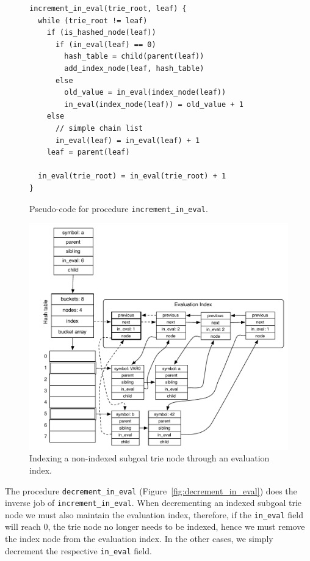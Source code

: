 \begin{figure}[ht]
\begin{Verbatim}
increment_in_eval(trie_root, leaf) {
  while (trie_root != leaf)
    if (is_hashed_node(leaf))
      if (in_eval(leaf) == 0)
        hash_table = child(parent(leaf))
        add_index_node(leaf, hash_table)
      else
        old_value = in_eval(index_node(leaf))
        in_eval(index_node(leaf)) = old_value + 1
    else
      // simple chain list
      in_eval(leaf) = in_eval(leaf) + 1
    leaf = parent(leaf)
    
  in_eval(trie_root) = in_eval(trie_root) + 1
}
\end{Verbatim}
\caption{Pseudo-code for procedure \texttt{increment\_in\_eval}.}
\label{fig:increment_in_eval}
\end{figure}

\begin{figure}[ht]
  \centering
  \includegraphics[scale=0.6]{hash_table_evaluation_index_increment.pdf}
  \caption{Indexing a non-indexed subgoal trie node through an evaluation index.}
  \label{fig:hash_table_evaluation_index_increment}
\end{figure}

The procedure \texttt{decrement\_in\_eval} (Figure~\ref{fig:decrement_in_eval})
does the inverse job of \texttt{increment\_in\_eval}. When decrementing an indexed
subgoal trie node we must also maintain the evaluation index, therefore, if the
\texttt{in\_eval} field will reach 0, the trie node no longer needs to be indexed,
hence we must remove the index node from the evaluation index. In the other cases,
we simply decrement the respective \texttt{in\_eval} field.

